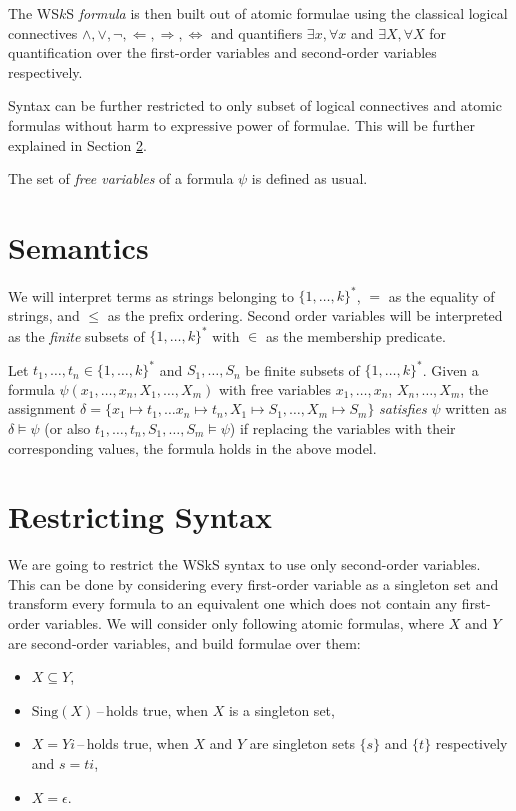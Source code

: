 The WS$k$S \emph{formula} is then built out of atomic formulae using the classical logical connectives $\wedge, \vee, \neg, \Leftarrow, \Rightarrow, \Leftrightarrow$ and quantifiers $\exists x, \forall x$ and $\exists X, \forall X$ for quantification over the first-order variables and second-order variables respectively.

Syntax can be further restricted to only subset of logical connectives and atomic formulas without harm to expressive power of formulae. This will be further explained in Section \ref{restricted}.

The set of \emph{free variables} of a formula $\psi$ is defined as usual.
  
  \section{Semantics}
	
	We will interpret terms as strings belonging to $\{1,\ldots,k\}^*$, $=$ as the equality of strings, and $\leq$ as the prefix ordering. Second order variables will be interpreted as the \emph{finite} subsets of $\{1,\ldots,k\}^*$ with $\in$ as the membership predicate.
	
	Let $t_1,\ldots,t_n \in \{1,\ldots,k\}^*$ and $S_1,\ldots,S_n$ be finite subsets of $\{1,\ldots,k\}^*$. Given a formula $\psi(x_1,\ldots,x_n,X_1,\ldots,X_m)$ with free variables $x_1,\ldots,x_n$, $X_n,\ldots,X_m$, the assignment $\delta = \{ x_1 \mapsto t_1,\ldots x_n \mapsto t_n, X_1 \mapsto S_1,\ldots, X_m \mapsto S_m\}$ \emph{satisfies} $\psi$ written as $\delta \vDash \psi$ (or also $t_1,\ldots, t_n, S_1,\ldots,S_m \vDash \psi$) if replacing the variables with their corresponding values, the formula holds in the above model.
	
  \section{Restricting Syntax}\label{restricted}
	We are going to restrict the WSkS syntax to use only second-order variables.
	This can be done by considering every first-order variable as a singleton set
	and transform every formula to an equivalent one which does not contain any
	first-order variables. We will consider only following atomic formulas, where
	$X$ and $Y$ are second-order variables, and build formulae over them:
	\begin{itemize}
	 \item $X \subseteq Y$,
	 \item $\text{Sing}(X)$\,--\,holds true, when $X$ is a singleton set,
	 \item $X = Yi$\,--\,holds true, when $X$ and $Y$ are singleton sets $\{s\}$ and $\{t\}$ respectively and $s = ti$,
	 \item $X = \epsilon$.
	\end{itemize}
	
